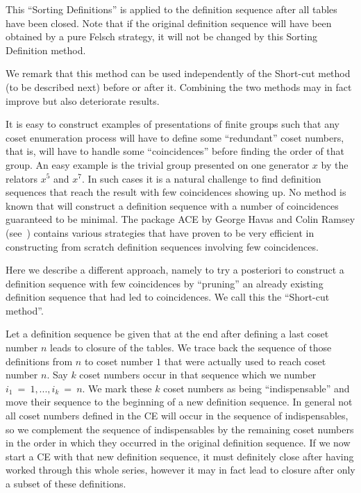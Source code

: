 This ``Sorting Definitions'' is applied to the definition sequence after
all tables have been closed. Note that if the original definition
sequence will have been obtained by a pure Felsch strategy, it will
not be changed by this Sorting Definition method.

We remark that this method can be used independently of the Short-cut
method (to be described next) before or after it. Combining the two
methods may in fact improve but also deteriorate results.



It is easy to construct examples of presentations of finite groups
such that any coset enumeration process will have to define some
``redundant'' coset numbers, that is, will have to handle some
``coincidences'' before finding the order of that group. An easy example
is the trivial group presented on one generator $x$ by the relators
$x^5$ and $x^7$. In such cases it is a natural challenge to find
definition sequences that reach the result with few coincidences
showing up. No method is known that will construct a definition
sequence with a number of coincidences guaranteed to be minimal. The
package ACE by George Havas and Colin Ramsey (see~\cite{Ram99})
contains various strategies that have proven to be very efficient in
constructing from scratch definition sequences involving few
coincidences.

Here we describe a different approach, namely to try a posteriori to
construct a definition sequence with few coincidences by ``pruning'' an
already existing definition sequence that had led to coincidences. We
call this the ``Short-cut method''.

Let a definition sequence be given that at the end after defining a
last coset number $n$ leads to closure of the tables. We trace back
the sequence of those definitions from $n$ to coset number $1$ that
were actually used to reach coset number $n$. Say $k$ coset numbers
occur in that sequence which we number $i_1~=~1,...,i_k~=~n$. We mark
these $k$ coset numbers as being ``indispensable'' and move their
sequence to the beginning of a new definition sequence. In general not
all coset numbers defined in the CE will occur in the sequence of
indispensables, so we complement the sequence of indispensables by the
remaining coset numbers in the order in which they occurred in the
original definition sequence. If we now start a CE with that new
definition sequence, it must definitely close after having worked
through this whole series, however it may in fact lead to closure
after only a subset of these definitions.

